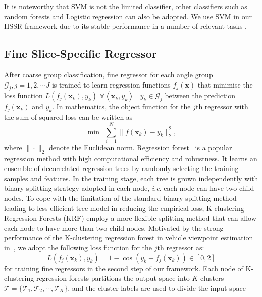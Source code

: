 \documentclass{tutmscthesis}[2010/09/22]
\numberwithin{equation}{section}
\numberwithin{table}{section}
\numberwithin{figure}{section}
\renewcommand{\vec}[1]{\bm{#1}}
\def\onedot{. }
\def\ie{\emph{i.e}\onedot} \def\Ie{\emph{I.e}\onedot}
\begin{document}
It is noteworthy that SVM is not the limited classifier, other classifiers such as random forests \cite{fanelli_IJCV,
  huang2010head} and Logistic regression \cite{demaris1995tutorial}
can also be adopted. We use SVM in our HSSR framework due to its
stable performance in a number of relevant tasks \cite{ozuysal2009pose, chen2011human, orozco2009head, munoz2012multi}. 
\subsection{Fine Slice-Specific Regressor}
\label{sec:regressor}
After coarse group classification, fine regressor for each angle group
$\mathcal{G}_j,j=1,2,\cdots J$ is trained to learn regression functions
$f_j(\vec{x})$ that minimise the loss function $L(f_j(\vec{x}_k),y_k)$
$\forall \left<\vec{x}_k,y_k\right> \mid y_k \in \mathcal{G}_j$ between the prediction
$f_j(\vec{x}_k)$ and $y_k$.
In mathematics, the object function for the $j$th regressor with the
sum of squared loss can be written as  
\begin{equation}
\min ~~\sum_{i=1}^N \|f(\vec{x}_k)-y_k\|_2^2,\label{eqn:obj}
\end{equation}
where $\|\cdot\|_2$ denote the Euclidean norm.
Regression forest~\cite{breiman2001random} is a popular regression
method with high computational efficiency and robustness. It learns
an ensemble of decorrelated regression trees by randomly selecting the
training samples and features.
In the training stage, each tree is grown independently with  binary
splitting strategy adopted in each node, \ie each node can have two
child nodes. To cope with the limitation of the standard binary
splitting method leading to less efficient tree model in
reducing the empirical loss, K-clustering Regression Forests (KRF)
\cite{hara2014growing} employ a more flexible splitting method that
can allow each node to have more than two child nodes. 
Motivated by the strong performance of the K-clustering regression
forest in vehicle viewpoint estimation in~\cite{hara2014growing}, we
adopt the following loss function for the $j$th regressor as:
\begin{equation}
L(f_j(\vec{x}_k),y_k) = 1 - \cos(y_k-f_j(\vec{x}_k))\in [0,2]
\end{equation} 
for training fine regressors in the second step of our framework. 
Each node of K-clustering regression forests partitions
the output space into $K$ clusters
$\mathcal{T} = \{\mathcal{T}_1,\mathcal{T}_2,\cdots,\mathcal{T}_K\}$,  
and the cluster labels are used to divide the input space
\end{document}
